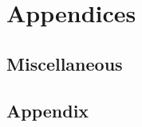\part{Appendices}
\newpage
\chapter{Miscellaneous} \label{ch:misc}

\newpage
\chapter{Appendix} \label{ch:appx}

\newpage
\listoffigures
\listoftables
\newpage
\printbibliography[title = {Aliquam}]


